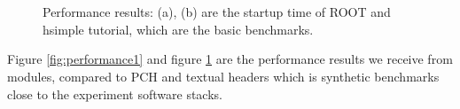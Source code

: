 \documentclass{webofc}
\begin{document}
\begin{figure}
\centering
    \begin{minipage}{.48\textwidth}
 　 \end{minipage}\hfill
    \begin{minipage}{.48\textwidth}
 　 \end{minipage}
\caption{Performance results: (a), (b) are the startup time of ROOT and hsimple tutorial, which are the basic benchmarks.}
\label{fig:performance2}
\end{figure}

Figure \ref{fig:performance1} and figure \ref{fig:performance2} are the performance results we receive from modules, compared to PCH and textual headers which is synthetic benchmarks close to the experiment software stacks.
\end{document}
